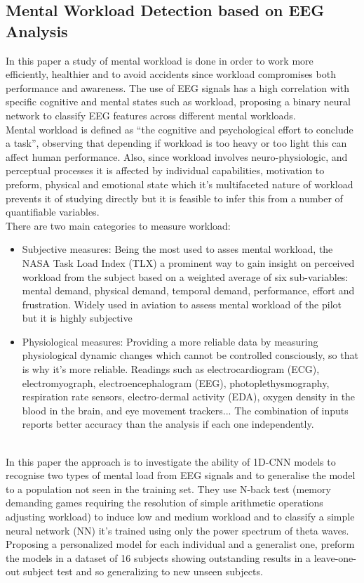 ﻿\documentclass[10pt,a4paper,twocolumn,twoside]{article}
\begin{document}
\subsection{Mental Workload Detection based on EEG Analysis}
\label{subsec-work1}
In this paper a study of mental workload is done in order to work more efficiently, healthier and to avoid accidents since workload compromises both performance and awareness. The use of EEG signals has a high correlation with specific cognitive and mental states such as workload, proposing a binary neural network to classify EEG features across different mental workloads.
\\
Mental workload is defined as “the cognitive and psychological effort to conclude a task”, observing that depending if workload is too heavy or too light this can affect human performance. Also, since workload involves neuro-physiologic, and perceptual processes it is affected by individual capabilities, motivation to preform, physical and emotional state which it’s multifaceted nature of workload prevents it of studying directly but it is feasible to infer this from a number of quantifiable variables.
\\
There are two main categories to measure workload:
\\
\begin{itemize}
\item Subjective measures: Being the most used to asses mental workload, the NASA Task Load Index (TLX) a prominent way to gain insight on perceived workload from the subject based on a weighted average of six sub-variables: mental demand, physical demand, temporal demand, performance, effort and frustration. Widely used in aviation to assess mental workload of the pilot but it is highly subjective
\item Physiological measures: Providing a more reliable data by measuring physiological dynamic changes which cannot be controlled consciously, so that is why it’s more reliable. Readings such as electrocardiogram (ECG), electromyograph, electroencephalogram (EEG), photoplethysmography, respiration rate sensors, electro-dermal activity (EDA), oxygen density in the blood in the brain, and eye movement trackers... The combination of inputs reports better accuracy than the analysis if each one independently.
\end{itemize}
\leavevmode\\
In this paper the approach is to investigate the ability of 1D-CNN models to recognise two types of mental load from EEG signals and to generalise the model to a population not seen in the training set. They use N-back test (memory demanding games requiring the resolution of simple arithmetic operations adjusting workload) to induce low and medium workload and to classify a simple neural network (NN) it’s trained using only the power spectrum of theta waves. Proposing a personalized model for each individual and a generalist one, preform the models in a dataset of 16 subjects showing outstanding results in a leave-one-out subject test and so generalizing to new unseen subjects.
\end{document}
